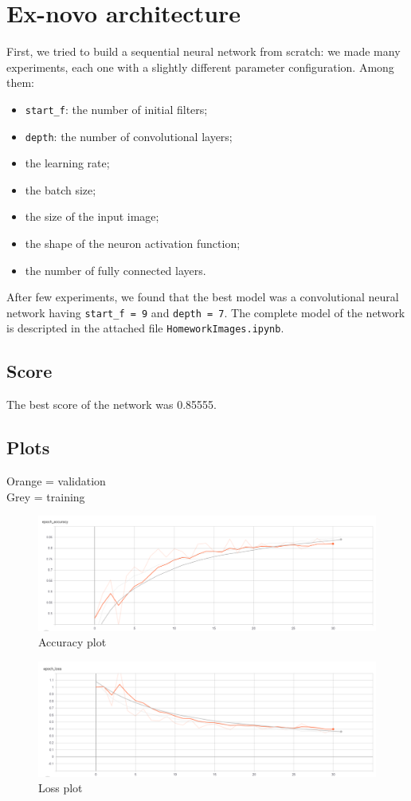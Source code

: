 \documentclass[12pt,a4paper]{report}
\begin{document}
		\section{Ex-novo architecture}
	First, we tried to build a sequential neural network from scratch: we made many experiments, each one with a slightly different parameter configuration. Among them:
			\begin{itemize}
				\item \texttt{start\_f}: the number of initial filters;
				\item \texttt{depth}: the number of convolutional layers;
				\item the learning rate;
				\item the batch size;
				\item the size of the input image;
				\item the shape of the neuron activation function;	
				\item the number of fully connected layers.
			\end{itemize}
	After few experiments, we found that the best model was a convolutional neural network having \texttt{start\_f = 9} and \texttt{depth = 7}. The complete model of the network is descripted in the attached file \texttt{HomeworkImages.ipynb}.
		\subsection{Score}
	The best score of the network was 0.85555.\newpage
		\subsection{Plots}
		Orange = validation\\
		Grey = training
		\begin{figure}[H]
			\includegraphics[scale = 0.6, center]{ex-Novo accuracy}
			\caption{Accuracy plot}
		\end{figure}
		\begin{figure}[H]
		\includegraphics[scale = 0.6, center]{ex-Novo loss}
		\caption{Loss plot}
		\end{figure}
\end{document}
